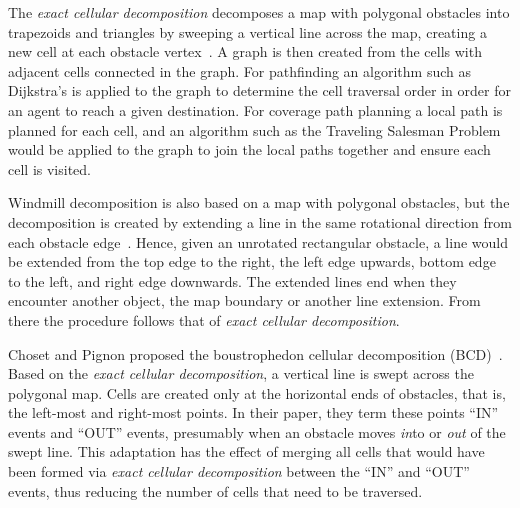 The \textit{exact cellular decomposition} decomposes a map with polygonal obstacles into trapezoids and triangles by sweeping a vertical line across the map, creating a new cell at each obstacle vertex~\cite{Robot_motion_planning}.
A graph is then created from the cells with adjacent cells connected in the graph.
For pathfinding an algorithm such as Dijkstra's is applied to the graph to determine the cell traversal order in order for an agent to reach a given destination.
For coverage path planning a local path is planned for each cell, and an algorithm such as the Traveling Salesman Problem would be applied to the graph to join the local paths together and ensure each cell is visited.

Windmill decomposition is also based on a map with polygonal obstacles, but the decomposition is created by extending a line in the same rotational direction from each obstacle edge~\cite{Windmill_decomp_for_free_pp}.
Hence, given an unrotated rectangular obstacle, a line would be extended from the top edge to the right, the left edge upwards, bottom edge to the left, and right edge downwards.
The extended lines end when they encounter another object, the map boundary or another line extension.
From there the procedure follows that of \textit{exact cellular decomposition}.

Choset and Pignon proposed the boustrophedon cellular decomposition (BCD)~\cite{Bous_cellular_decomp}.
Based on the \textit{exact cellular decomposition}, a vertical line is swept across the polygonal map.
Cells are created only at the horizontal ends of obstacles, that is, the left-most and right-most points.
In their paper, they term these points ``IN'' events and ``OUT'' events, presumably when an obstacle moves \textit{in}to or \textit{out} of the swept line.
This adaptation has the effect of merging all cells that would have been formed via \textit{exact cellular decomposition} between the ``IN'' and ``OUT'' events, thus reducing the number of cells that need to be traversed.

